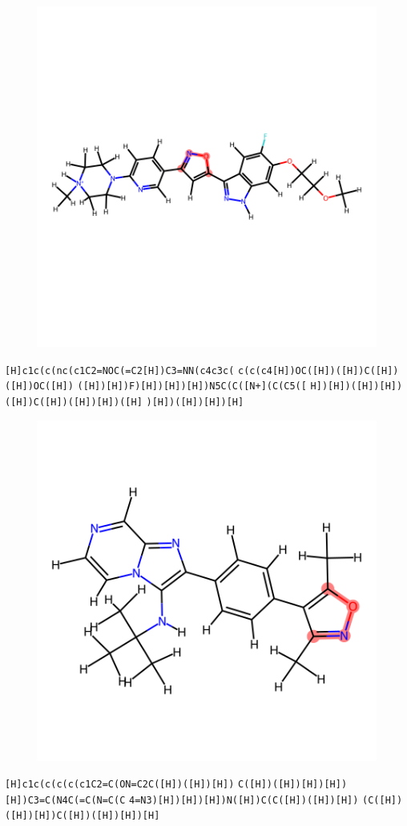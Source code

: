 \documentclass{article}
\begin{document}
\begin{figure}[ht]
\centering
    \includegraphics{mol292.png}
\end{figure}
\verb|[H]c1c(c(nc(c1C2=NOC(=C2[H])C3=NN(c4c3c(| \verb|c(c(c4[H])OC([H])([H])C([H])([H])OC([H])| \verb|([H])[H])F)[H])[H])[H])N5C(C([N+](C(C5([| \verb|H])[H])([H])[H])([H])C([H])([H])[H])([H]| \verb|)[H])([H])[H])[H]|

\begin{figure}[ht]
\centering
    \includegraphics{mol293.png}
\end{figure}
\verb|[H]c1c(c(c(c(c1C2=C(ON=C2C([H])([H])[H])| \verb|C([H])([H])[H])[H])[H])C3=C(N4C(=C(N=C(C| \verb|4=N3)[H])[H])[H])N([H])C(C([H])([H])[H])| \verb|(C([H])([H])[H])C([H])([H])[H])[H]|
\end{document}
